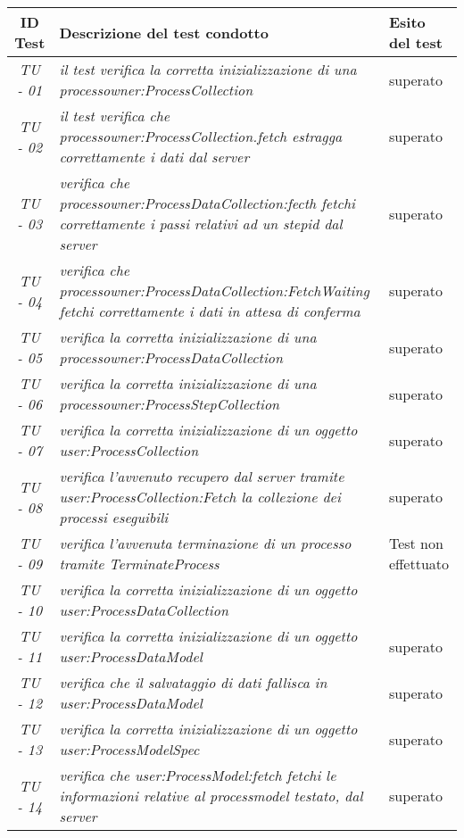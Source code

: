 \begin{small}\centering
\begin{tabular}{|c|p{8.0cm}|p{2.0cm}|}
\hline
\textbf{ID Test} & \textbf{Descrizione del test condotto} & \textbf{Esito del test} \\
\hline
\textit{TU - 01} &
\textit{il test verifica la corretta inizializzazione di una processowner:ProcessCollection} & superato \\
\hline
\textit{TU - 02} &
\textit{il test verifica che  processowner:ProcessCollection.fetch estragga correttamente i dati dal server } & superato \\
\hline
\textit{TU - 03} & 
\textit{verifica che processowner:ProcessDataCollection:fecth fetchi correttamente i passi relativi ad un stepid dal server} & superato  \\
\hline
\textit{TU - 04} &
\textit{verifica che processowner:ProcessDataCollection:FetchWaiting fetchi correttamente i dati in attesa di conferma} & superato  \\
\hline
\textit{TU - 05} &
\textit{verifica la corretta inizializzazione di una processowner:ProcessDataCollection } & superato \\
\hline
\textit{TU - 06} &
\textit{verifica la corretta inizializzazione di una processowner:ProcessStepCollection} & superato  \\
\hline
\textit{TU - 07} &
\textit{verifica la corretta inizializzazione di un oggetto user:ProcessCollection} &  superato\\
\hline
\textit{TU - 08} &
\textit{verifica l'avvenuto recupero dal server tramite user:ProcessCollection:Fetch la collezione dei processi eseguibili} & superato \\
\hline
\textit{TU - 09} &
\textit{verifica l'avvenuta terminazione di un processo tramite TerminateProcess} & Test non effettuato \\
\hline
\textit{TU - 10} &
\textit{verifica la corretta inizializzazione di un oggetto user:ProcessDataCollection} &  \\
\hline
\textit{TU - 11} &
\textit{verifica la corretta inizializzazione di un oggetto user:ProcessDataModel} & superato \\
\hline
\textit{TU - 12} &
\textit{verifica che il salvataggio di dati fallisca in user:ProcessDataModel} & superato \\
\hline
\textit{TU - 13} &
\textit{verifica la corretta inizializzazione di un oggetto user:ProcessModelSpec} & superato \\
\hline
\textit{TU - 14} &
\textit{verifica che user:ProcessModel:fetch fetchi le informazioni relative al processmodel testato, dal server} & superato \\
\hline
\end{tabular}\\
\end{small}
